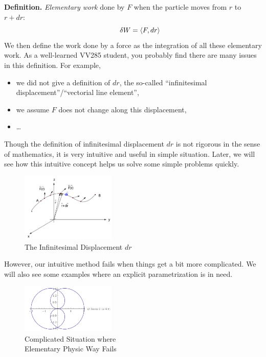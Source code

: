 \documentclass[11pt, t]{beamer}
\renewcommand{\emph}[1]{{\color{Turquoise3}\textsl{#1}}}
\begin{document}
\begin{frame}[allowframebreaks]
    \textbf{Definition.} \emph{Elementary work} done by $F$ when the particle moves from $r$ to $r+d r$:
    \begin{equation}
        \qquad \delta W=\langle F,d r\rangle
        \vspace{10pt}
    \end{equation}
    We then define the work done by a force as the integration of all these elementary work. As a well-learned VV285 student, you probably find there are many issues in this definition. For example,
    \begin{itemize}
        \item we did not give a definition of $dr$, the so-called ``infinitesimal displacement''/``vectorial line element'',
        \item we assume $F$ does not change along this displacement,
        \item \dots
    \end{itemize}
    \newpage
    Though the definition of infinitesimal displacement $dr$ is not rigorous in the sense of mathematics, it is very intuitive and useful in simple situation. Later, we will see how this intuitive concept helps us solve some simple problems quickly.
    \begin{figure}[H]
        \centering
        \includegraphics[width=0.4\textwidth]{2020-07-15-11-45-14.png}
        \caption{The Infinitesimal Displacement $dr$}
        \label{fig:}
    \end{figure}

    However, our intuitive method fails when things get a bit more complicated. We will also see some examples where an explicit parametrization is in need.
    \vspace{10pt}
    \begin{figure}[H]
        \centering
        \includegraphics[width=0.4\textwidth]{2020-07-15-11-47-47.png}
        \caption{Complicated Situation where \\Elementary Physic Way Fails}
        \label{fig:}
    \end{figure}

\end{frame}
\end{document}
